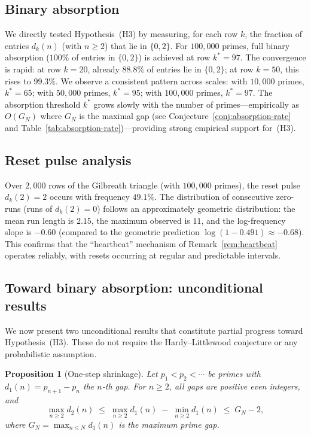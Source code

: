 \documentclass[11pt, a4paper]{amsart}
\theoremstyle{plain}
\newtheorem{proposition}[theorem]{Proposition}
\theoremstyle{definition}
\begin{document}
\subsection{Binary absorption}
We directly tested Hypothesis~(H3) by measuring, for each row $k$, the fraction of entries $d_k(n)$ (with $n \ge 2$)
that lie in $\{0, 2\}$. For $100{,}000$ primes, full binary absorption ($100\%$ of entries in $\{0, 2\}$) is achieved
at row $k^* = 97$. The convergence is rapid: at row $k = 20$, already $88.8\%$ of entries lie in $\{0, 2\}$;
at row $k = 50$, this rises to $99.3\%$. We observe a consistent pattern across scales: with $10{,}000$ primes,
$k^* = 65$; with $50{,}000$ primes, $k^* = 95$; with $100{,}000$ primes, $k^* = 97$. The absorption threshold
$k^*$ grows slowly with the number of primes---empirically as $O(G_N)$ where $G_N$ is the maximal gap
(see Conjecture~\ref{conj:absorption-rate} and Table~\ref{tab:absorption-rate})---providing strong empirical support for~(H3).

\subsection{Reset pulse analysis}
Over $2{,}000$ rows of the Gilbreath triangle (with $100{,}000$ primes), the reset pulse $d_k(2) = 2$ occurs
with frequency $49.1\%$. The distribution of consecutive zero-runs (runs of $d_k(2) = 0$) follows an approximately
geometric distribution: the mean run length is $2.15$, the maximum observed is $11$, and the log-frequency slope
is $-0.60$ (compared to the geometric prediction $\log(1 - 0.491) \approx -0.68$). This confirms that the
``heartbeat'' mechanism of Remark~\ref{rem:heartbeat} operates reliably, with resets occurring at regular
and predictable intervals.

\subsection{Toward binary absorption: unconditional results}
\label{sec:toward-absorption}

We now present two unconditional results that constitute partial progress toward Hypothesis~(H3).
These do not require the Hardy--Littlewood conjecture or any probabilistic assumption.

\begin{proposition}[One-step shrinkage]\label{prop:shrinkage}
Let $p_1 < p_2 < \cdots$ be primes with $d_1(n) = p_{n+1} - p_n$ the $n$-th gap. For $n \ge 2$, all gaps are
positive even integers, and
\[
\max_{n \ge 2} d_2(n) \;\le\; \max_{n \ge 2} d_1(n) \;-\; \min_{n \ge 2} d_1(n) \;\le\; G_N - 2,
\]
where $G_N = \max_{n \le N} d_1(n)$ is the maximum prime gap.
\end{proposition}
\end{document}
